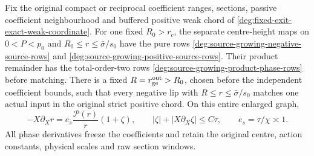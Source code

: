 \begin{lemma}
\label{deg:lem-growing-matching-direct}
Fix the original compact or reciprocal coefficient ranges, sections,
passive coefficient neighbourhood and buffered positive weak chord
of \eqref{deg:fixed-exit-exact-weak-coordinate}.
For one fixed \(R_0>r_c\), the separate centre-height maps on
\(0<P<p_0\) and \(R_0\le r\le\bar\sigma/s_0\) have the
pure rows \eqref{deg:source-growing-negative-source-rows} and
\eqref{deg:source-growing-positive-source-rows}.
Their product remainder has the total-order-two rows
\eqref{deg:source-growing-product-phase-rows} before matching.
There is a fixed \(R=r_{\rm ge}^{\rm out}>R_0\), chosen before
the independent coefficient bounds, such that every negative lip
with \(R\le r\le\bar\sigma/s_0\) matches one actual input in
the original strict positive chord. On this entire enlarged graph,
\[
 -X\partial_Xr=e_s\frac{\mathcal P(r)}r(1+\zeta),\qquad
 |\zeta|+|X\partial_X\zeta|\le C\tau,
 \qquad e_s=\tau/\chi\asymp1.
\]
All phase derivatives freeze the coefficients and retain the original
centre, action constants, physical scales and raw section windows.
\end{lemma}
